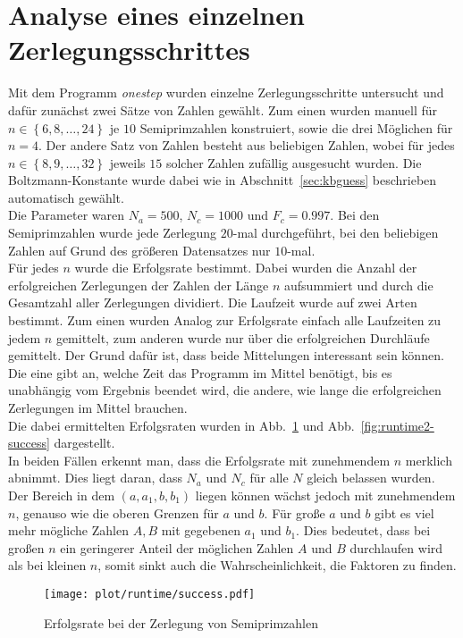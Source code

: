 \section{Analyse eines einzelnen Zerlegungsschrittes}
Mit dem Programm \textit{onestep} wurden einzelne Zerlegungsschritte untersucht und dafür zunächst zwei Sätze von Zahlen gewählt. Zum einen wurden manuell für $n\in\left\{6,8,\dots,24\right\}$ je $10$ Semiprimzahlen konstruiert, sowie die drei Möglichen für $n=4$. Der andere Satz von Zahlen besteht aus beliebigen Zahlen, wobei für jedes $n\in\left\{8,9,\dots,32\right\}$ jeweils $15$ solcher Zahlen zufällig ausgesucht wurden. Die Boltzmann-Konstante wurde dabei wie in Abschnitt~\ref{sec:kbguess} beschrieben automatisch gewählt.\\
Die Parameter waren $N_a=500$, $N_c=1000$ und $F_c=0.997$. Bei den Semiprimzahlen wurde jede Zerlegung $20$-mal durchgeführt, bei den beliebigen Zahlen auf Grund des größeren Datensatzes nur $10$-mal. \\
Für jedes $n$ wurde die Erfolgsrate bestimmt. Dabei wurden die Anzahl der erfolgreichen Zerlegungen der Zahlen der Länge $n$ aufsummiert und durch die Gesamtzahl aller Zerlegungen dividiert. Die Laufzeit wurde auf zwei Arten bestimmt. Zum einen wurden Analog zur Erfolgsrate einfach alle Laufzeiten zu jedem $n$ gemittelt, zum anderen wurde nur über die erfolgreichen Durchläufe gemittelt. Der Grund dafür ist, dass beide Mittelungen interessant sein können. Die eine gibt an, welche Zeit das Programm im Mittel benötigt, bis es unabhängig vom Ergebnis beendet wird, die andere, wie lange die erfolgreichen Zerlegungen im Mittel brauchen. \\
Die dabei ermittelten Erfolgsraten wurden in Abb.~\ref{fig:runtime-success} und Abb.~\ref{fig:runtime2-success} dargestellt. \\
In beiden Fällen erkennt man, dass die Erfolgsrate mit zunehmendem $n$ merklich abnimmt. Dies liegt daran, dass $N_a$ und $N_c$ für alle $N$ gleich belassen wurden. Der Bereich in dem $\left(a,a_1,b,b_1\right)$ liegen können wächst jedoch mit zunehmendem $n$, genauso wie die oberen Grenzen für $a$ und $b$. Für große $a$ und $b$ gibt es viel mehr mögliche Zahlen $A, B$ mit gegebenen $a_1$ und $b_1$. Dies bedeutet, dass bei großen $n$ ein geringerer Anteil der möglichen Zahlen $A$ und $B$ durchlaufen wird als bei kleinen $n$, somit sinkt auch die Wahrscheinlichkeit, die Faktoren zu finden.
\begin{figure}[ht]
		\centering
		\texttt{[image: plot/runtime/success.pdf]}
		\caption{Erfolgsrate bei der Zerlegung von Semiprimzahlen}\label{fig:runtime-success}
\end{figure}
